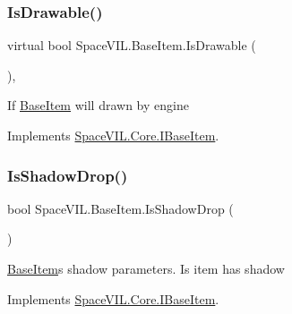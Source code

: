 \mbox{\label{class_space_v_i_l_1_1_base_item_a002a247f3745be1e1e57c504589d7036}} 
\subsubsection{\texorpdfstring{Is\+Drawable()}{IsDrawable()}}
{\footnotesize\ttfamily virtual bool Space\+V\+I\+L.\+Base\+Item.\+Is\+Drawable (\begin{DoxyParamCaption}{ }\end{DoxyParamCaption})\hspace{0.3cm}{\ttfamily [inline]}, {\ttfamily [virtual]}}



If \mbox{\hyperlink{class_space_v_i_l_1_1_base_item}{Base\+Item}} will drawn by engine 



Implements \mbox{\hyperlink{interface_space_v_i_l_1_1_core_1_1_i_base_item}{Space\+V\+I\+L.\+Core.\+I\+Base\+Item}}.

\mbox{\label{class_space_v_i_l_1_1_base_item_aaed84b5d9c5b4b05ca46d72dcf370ef3}} 
\subsubsection{\texorpdfstring{Is\+Shadow\+Drop()}{IsShadowDrop()}}
{\footnotesize\ttfamily bool Space\+V\+I\+L.\+Base\+Item.\+Is\+Shadow\+Drop (\begin{DoxyParamCaption}{ }\end{DoxyParamCaption})\hspace{0.3cm}{\ttfamily [inline]}}



\mbox{\hyperlink{class_space_v_i_l_1_1_base_item}{Base\+Item}}\textquotesingle{}s shadow parameters. Is item has shadow 



Implements \mbox{\hyperlink{interface_space_v_i_l_1_1_core_1_1_i_base_item}{Space\+V\+I\+L.\+Core.\+I\+Base\+Item}}.

